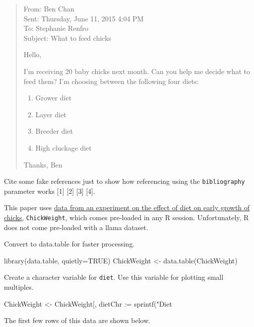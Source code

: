 \documentclass[10pt]{article}
\newenvironment{CodeChunk}{}{}
\begin{document}
\begin{quote}
From: Ben Chan\\Sent: Thursday, June 11, 2015 4:04 PM\\To: Stephanie
Renfro\\Subject: What to feed chicks

Hello,

I'm receiving 20 baby chicks next month. Can you help me decide what to
feed them? I'm choosing between the following four diets:

\begin{enumerate}
\def\labelenumi{\arabic{enumi}.}
\itemsep1pt\parskip0pt
\item
  Grower diet\\
\item
  Layer diet
\item
  Breeder diet
\item
  High cluckage diet
\end{enumerate}

Thanks, Ben
\end{quote}

Cite some fake references just to show how referencing using the
\texttt{bibliography} parameter works {[}1{]} {[}2{]} {[}3{]} {[}4{]}.

This paper uses
\href{http://www.inside-r.org/r-doc/datasets/ChickWeight}{data from an
experiment on the effect of diet on early growth of chicks},
\texttt{ChickWeight}, which comes pre-loaded in any R session.
Unfortunately, R does not come pre-loaded with a llama dataset.

Convert to data.table for faster processing.

\begin{CodeChunk}
\begin{CodeInput}
library(data.table, quietly=TRUE)
ChickWeight <- data.table(ChickWeight)
\end{CodeInput}
\end{CodeChunk}

Create a character variable for \texttt{diet}. Use this variable for
plotting small multiples.

\begin{CodeChunk}
\begin{CodeInput}
ChickWeight <- ChickWeight[, dietChr := sprintf("Diet %
\end{CodeInput}
\end{CodeChunk}

The first few rows of this data are shown below.
\end{document}
